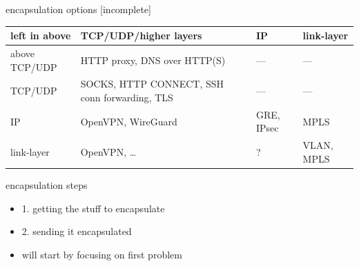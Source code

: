 \begin{frame}{encapsulation options [incomplete]}
\small
\begin{tabular}{l||p{4cm}|p{4cm}|p{2cm}}
left in above       & TCP/UDP/higher layers & IP & link-layer \\ \hline \hline
above TCP/UDP       & HTTP proxy, DNS over HTTP(S) & --- & --- \\ \hline
TCP/UDP             & SOCKS, HTTP CONNECT, SSH conn forwarding, TLS & --- & --- \\\hline
IP                  & OpenVPN, WireGuard & GRE, IPsec & MPLS \\\hline
link-layer          & OpenVPN, \ldots & ? & VLAN, MPLS \\\hline
\end{tabular}
\end{frame}

\begin{frame}{encapsulation steps}
    \begin{itemize}
    \item 1. getting the stuff to encapsulate
    \item 2. sending it encapsulated
    \vspace{.5cm}
    \item will start by focusing on first problem
    \end{itemize}
\end{frame}

